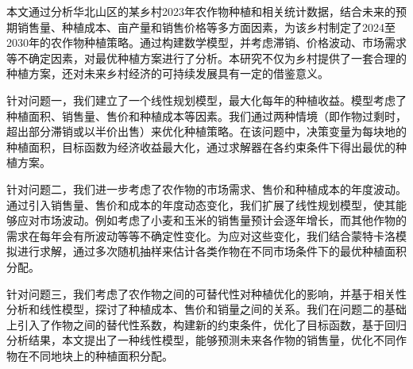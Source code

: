 

{\song\xiaosihao
\setlength{\parindent}{2em}
本文通过分析华北山区的某乡村2023年农作物种植和相关统计数据，结合未来的预期销售量、种植成本、亩产量和销售价格等多方面因素，为该乡村制定了2024至2030年的农作物种植策略。通过构建数学模型，并考虑滞销、价格波动、市场需求等不确定因素，对最优种植方案进行了分析。本研究不仅为乡村提供了一套合理的种植方案，还对未来乡村经济的可持续发展具有一定的借鉴意义。

\setlength{\parindent}{2em} 针对问题一，我们建立了一个线性规划模型，最大化每年的种植收益。模型考虑了种植面积、销售量、售价和种植成本等因素。我们通过两种情境（即作物过剩时，超出部分滞销或以半价出售）来优化种植策略。在该问题中，决策变量为每块地的种植面积，目标函数为经济收益最大化，通过求解器在各约束条件下得出最优的种植方案。

\setlength{\parindent}{2em} 针对问题二，我们进一步考虑了农作物的市场需求、售价和种植成本的年度波动。通过引入销售量、售价和成本的年度动态变化，我们扩展了线性规划模型，使其能够应对市场波动。例如考虑了小麦和玉米的销售量预计会逐年增长，而其他作物的需求在每年会有所波动等等不确定性变化。为应对这些变化，我们结合蒙特卡洛模拟进行求解，通过多次随机抽样来估计各类作物在不同市场条件下的最优种植面积分配。

\setlength{\parindent}{2em} 针对问题三，我们考虑了农作物之间的可替代性对种植优化的影响，并基于相关性分析和线性模型，探讨了种植成本、售价和销量之间的关系。我们在问题二的基础上引入了作物之间的替代性系数，构建新的约束条件，优化了目标函数，基于回归分析结果，本文提出了一种线性模型，能够预测未来各作物的销售量，优化不同作物在不同地块上的种植面积分配。
}





